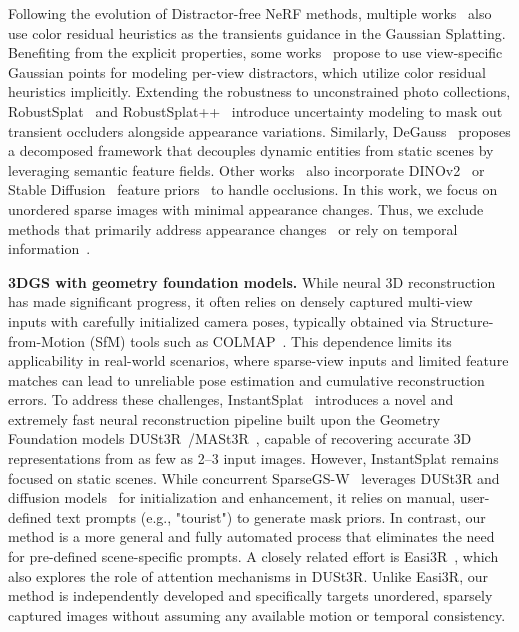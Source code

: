 \documentclass[letterpaper, 10 pt, conference]{ieeeconf}  %
\begin{document}
Following the evolution of Distractor-free NeRF methods, multiple works~\cite{sabour2025spotlesssplats, ungermann2024robust} also use color residual heuristics as the transients guidance in the Gaussian Splatting. Benefiting from the explicit properties, some works~\cite{lin2024hybridgs, wang2024desplat} propose to use view-specific Gaussian points for modeling per-view distractors, which utilize color residual heuristics implicitly. Extending the robustness to unconstrained photo collections, RobustSplat~\cite{fu2025robustsplat} and RobustSplat++~\cite{fu2025robustsplat++} introduce uncertainty modeling to mask out transient occluders alongside appearance variations. Similarly, DeGauss~\cite{wang2025degauss} proposes a decomposed framework that decouples dynamic entities from static scenes by leveraging semantic feature fields. Other works~\cite{kulhanek2024wildgaussians, park2025forestsplats} also incorporate DINOv2~\cite{oquab2024dinov2} or Stable Diffusion~\cite{rombach2022high} feature priors~\cite{sabour2025spotlesssplats} to handle occlusions. In this work, we focus on unordered sparse images with minimal appearance changes. Thus, we exclude methods that primarily address appearance changes~\cite{zhang2024gaussian, xu2024wild} or rely on temporal information~\cite{goli2024romo, markin2024t, xu2024das3r}.

\noindent
\textbf{3DGS with geometry foundation models.} While neural 3D reconstruction has made significant progress, it often relies on densely captured multi-view inputs with carefully initialized camera poses, typically obtained via Structure-from-Motion (SfM) tools such as COLMAP~\cite{schonberger2016structure}. This dependence limits its applicability in real-world scenarios, where sparse-view inputs and limited feature matches can lead to unreliable pose estimation and cumulative reconstruction errors. To address these challenges, InstantSplat~\cite{fan2024instantsplat} introduces a novel and extremely fast neural reconstruction pipeline built upon the Geometry Foundation models DUSt3R~\cite{wang2024dust3r}/MASt3R~\cite{leroy2024grounding}, capable of recovering accurate 3D representations from as few as 2–3 input images. However, InstantSplat remains focused on static scenes. While concurrent SparseGS-W~\cite{li2025sparsegs} leverages DUSt3R and diffusion models~\cite{rombach2022high} for initialization and enhancement, it relies on manual, user-defined text prompts (e.g., "tourist") to generate mask priors.
In contrast, our method is a more general and fully automated process that eliminates the need for pre-defined scene-specific prompts. A closely related effort is Easi3R~\cite{chen2025easi3r}, which also explores the role of attention mechanisms in DUSt3R. Unlike Easi3R, our method is independently developed and specifically targets unordered, sparsely captured images without assuming any available motion or temporal consistency.
\end{document}
